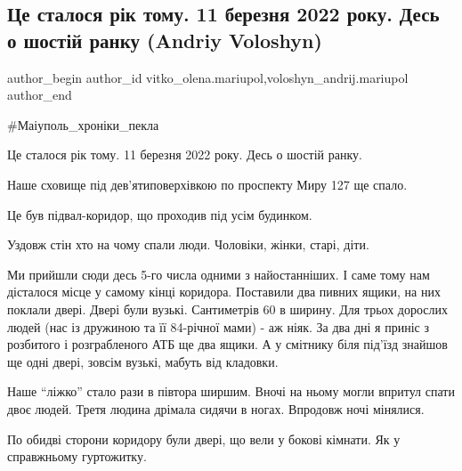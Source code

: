 
 
 
 
 

\subsection{Це сталося рік тому. 11 березня 2022 року. Десь о шостій ранку (Andriy Voloshyn)}
\label{sec:13_03_2023.fb.vitko_olena.mariupol.1.tse_stalosya_r_k_tom}
 
\ifcmt
 author_begin
   author_id vitko_olena.mariupol,voloshyn_andrij.mariupol
 author_end
\fi

\#Маіуполь\_хроніки\_пекла

Це сталося рік тому. 11 березня 2022 року. Десь о шостій ранку.


Наше сховище під дев'ятиповерхівкою по проспекту Миру 127 ще спало.

Це був підвал-коридор, що проходив під усім будинком.

Уздовж стін хто на чому спали люди. Чоловіки, жінки, старі, діти.

Ми прийшли сюди десь 5-го числа одними з найостанніших. І саме тому нам
дісталося місце у самому кінці коридора. Поставили два пивних ящики, на них
поклали двері. Двері були вузькі. Сантиметрів 60 в ширину. Для трьох дорослих
людей (нас із дружиною та її 84-річної мами) - аж ніяк. За два дні я приніс з
розбитого і розграбленого АТБ ще два ящики. А у смітнику біля під'їзд знайшов
ще одні двері, зовсім вузькі, мабуть від кладовки.

Наше \enquote{ліжко} стало рази в півтора ширшим. Вночі на ньому могли впритул спати
двоє людей. Третя людина дрімала сидячи в ногах. Впродовж ночі мінялися.

По обидві сторони коридору були  двері, що вели у бокові кімнати. Як у
справжньому гуртожитку.

